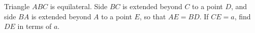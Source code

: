 Triangle $ABC$ is equilateral. Side $BC$ is extended beyond $C$ to a point $D$, and side $BA$ is extended beyond $A$ to a point $E$, so that $AE=BD$. If $CE=a$, find $DE$ in terms of $a$.
